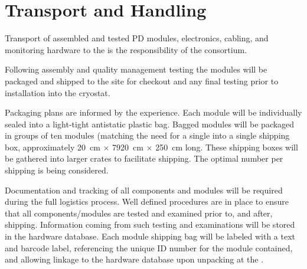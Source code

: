 \section{Transport and Handling}
\label{sec:fdsp-pd-install}


%


Transport of assembled and tested PD modules, electronics, cabling, and monitoring hardware to the is the responsibility of the  consortium.


Following assembly and quality management testing  the  modules  will be packaged and shipped to the  site for checkout and any final testing prior to installation into the cryostat. 

Packaging plans are informed by the  experience.  Each  module will be individually sealed into a light-tight antistatic plastic bag.  Bagged modules will be packaged in groups of ten modules (matching the need for a single  into a single shipping box, approximately \SI{20}{cm} $\times$ \SI{7920}{cm} $\times$ \SI{250}{cm} long.  These shipping boxes will be gathered into larger crates to facilitate shipping.  The optimal number per shipping is being considered.

Documentation and tracking of all components and  modules will be required during the full logistics process. Well defined procedures are in place to ensure that all components/modules are tested and examined prior to, and after, shipping. Information coming from such testing and examinations will be stored in the  hardware database.  Each  module shipping bag will be labeled with a text and barcode label, referencing the unique ID number for the module contained, and allowing linkage to the hardware database upon unpacking at the .

